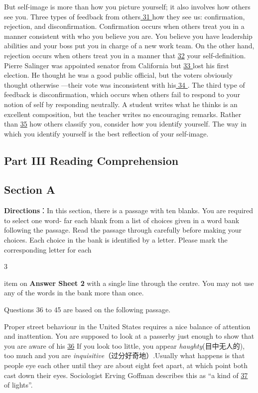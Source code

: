 \documentclass[UTF8,11pt]{ctexart}
\begin{document}
But self-image is more than how you picture yourself; it also involves how others see you. Three types of feedback from others\uline{ 31 }how they see us: confirmation, rejection, and disconfirmation. Confirmation occurs when others treat you in a manner consistent with who you believe you are. You believe you have leadership abilities and your boss put you in charge of a new work team. On the other hand, rejection occurs when others treat you in a manner that \uline{32} your self-definition. Pierre Salinger was appointed senator from California but \uline{33 }lost his first election. He thought he was a good public official, but the voters obviously thought otherwise —their vote was inconsistent with his\uline{ 34 }. The third type of feedback is disconfirmation, which occurs when others fail to respond to your notion of self by responding neutrally. A student writes what he thinks is an excellent composition, but the teacher writes no encouraging remarks. Rather than \uline{35} how others classify you, consider how you identify yourself. The way in which you identify yourself is the best reflection of your self-image.


\subsection*{\textbf{Part III} \textbf{Reading Comprehension}}


\subsection*{\textbf{Section A}}


\textbf{Directions}：In this section, there is a passage with ten blanks. You are required to select one word- far each blank from a list of choices given in a word bank following the passage. Read the passage through carefully before making your choices. Each choice in the bank is identified by a letter. Please mark the corresponding letter for each


3


item on\textbf{ Answer Sheet 2} with a single line through the centre. You may not use any of the words in the bank more than once.


Questions 36 to 45 are based on the following passage.


Proper street behaviour in the United States requires a nice balance of attention and inattention. You are supposed to look at a passerby just enough to show that you are aware of his \uline{36} If you look too little, you appear\textit{ haughty}(目中无人的), too much and you are\textit{ inquisitive}（过分好奇地）.Usually what happens is that people eye each other until they are about eight feet apart, at which point both cast down their eyes. Sociologist Erving Goffman describes this as “a kind of \uline{37 }of lights”.
\end{document}
